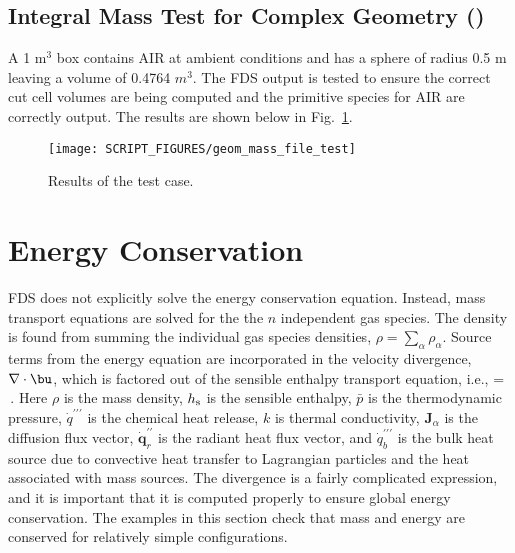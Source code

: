 \documentclass[11pt]{book}
\begin{document}
\subsection{Integral Mass Test for Complex Geometry (\texorpdfstring{}{geom\_mass\_file\_test})}
\label{geom_mass_file_test}

A 1 m$^3$ box contains AIR at ambient conditions and has a sphere of radius 0.5 m leaving a volume of 0.4764 $m^3$.  The FDS  output is tested to ensure the correct cut cell volumes are being computed and the primitive species for AIR are correctly output.  The results are shown below in Fig.~\ref{fig:geom_mass_file_test}.

\begin{figure}[ht]
\centering
\texttt{[image: SCRIPT\_FIGURES/geom\_mass\_file\_test]}
\caption[The  test case]{Results of the  test case.}
\label{fig:geom_mass_file_test}
\end{figure}

\section{Energy Conservation}

FDS does not explicitly solve the energy conservation equation. Instead, mass transport equations are solved for the the $n$ independent gas species.  The density is found from summing the individual gas species densities, $\rho = \sum_\alpha \rho_\alpha$. Source terms from the energy equation are incorporated in the velocity  divergence, $\nabla \cdot \bu$, which is factored out of the sensible enthalpy transport equation, i.e.,
\be
\label{eqn_new_div}
\nabla\cdot{} =   \,\mbox{.}
\ee
Here $\rho$ is the mass density, $h_{\rm s}$ is the sensible enthalpy, $\bar{p}$ is the thermodynamic pressure, $\dot{q}^{\prime\prime\prime}$ is the chemical heat release, $k$ is thermal conductivity, $\mathbf{J}_\alpha$ is the diffusion flux vector, $\dot{\mathbf{q}}_r^{\prime\prime}$ is the radiant heat flux vector, and $\dot{q}_b^{\prime\prime\prime}$ is the bulk heat source due to convective heat transfer to Lagrangian particles and the heat associated with mass sources. The divergence is a fairly complicated expression, and it is important that it is computed properly to ensure global energy conservation. The examples in this section check that mass and energy are conserved for relatively simple configurations.
\end{document}
